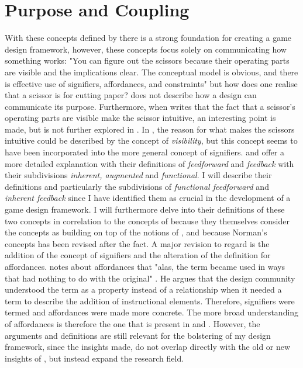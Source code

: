 \section{Purpose and Coupling}
With these concepts defined by  there is a strong foundation for creating a game design framework, however, these concepts focus solely on communicating how something works: "You can figure out the scissors because their operating parts are visible and the implications clear. The conceptual model is obvious, and there is effective use of signifiers, affordances, and constraints" \cite[p. 27]{norman} but how does one realise that a scissor is for cutting paper?  does not describe how a design can communicate its purpose. Furthermore, when  writes that the fact that a scissor's operating parts are visible make the scissor intuitive, an interesting point is made, but is not further explored in . In , the reason for what makes the scissors intuitive could be described by the concept of \textit{visibility}, but this concept seems to have been incorporated into the more general concept of signifiers.  and  offer a more detailed explanation with their definitions of \textit{feedforward} and \textit{feedback} with their subdivisions \textit{inherent, augmented} and \textit{functional}. I will describe their definitions and particularly the subdivisions of \textit{functional feedforward} and \textit{inherent feedback} since I have identified them as crucial in the development of a game design framework. I will furthermore delve into their definitions of these two concepts in correlation to the concepts of  because they themselves consider the concepts as building on top of the notions of , and because Norman's concepts has been revised \cite{norman} after the fact. A major revision to regard is the addition of the concept of signifiers and the alteration of the definition for affordances.  notes about affordances that "alas, the term became used in ways that had nothing to do with the original" \cite[p. 13]{norman}. He argues that the design community understood the term as a property instead of a relationship when it needed a term to describe the addition of instructional elements. Therefore, signifiers were termed and affordances were made more concrete. The more broad understanding of affordances is therefore the one that is present in  and . However, the arguments and definitions are still relevant for the bolstering of my design framework, since the insights made, do not overlap directly with the old or new insights of , but instead expand the research field.

